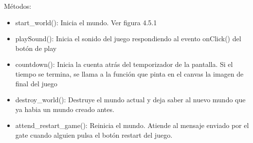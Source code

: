Métodos:
\begin{itemize}
 \item start\_world():
Inicia el mundo. Ver figura 4.5.1

 \item playSound():
Inicia el sonido del juego respondiendo al evento onClick() del botón de play

 \item countdown():
Inicia la cuenta atrás del temporizador de la pantalla. Si el tiempo se termina, se llama a la función que pinta en el canvas la imagen de final del juego

 \item destroy\_world():
Destruye el mundo actual y deja saber al nuevo mundo que ya habia un mundo creado antes.

 \item attend\_restart\_game():
Reinicia el mundo. Atiende al mensaje enviado por el gate cuando alguien pulsa el botón restart del juego.
\end{itemize}
